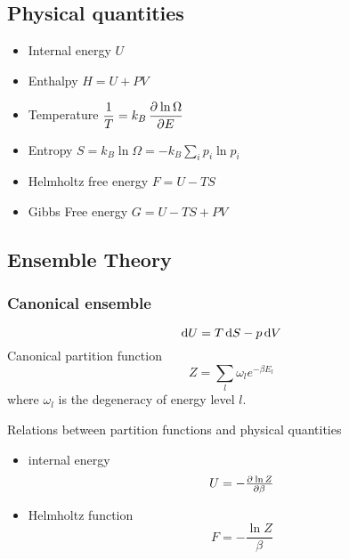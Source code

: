 \documentclass{article}
\begin{document}
\subsection{Physical quantities}
\begin{itemize}
\item Internal energy $U$
\item Enthalpy $H=U+PV$
\item Temperature $\dfrac{1}{T}=k_B\dpd{\ln\Omega}{E}$
\item Entropy $S=k_B\ln\Omega=-k_B\sum_i{p_i\ln p_i}$
\item Helmholtz free energy $F=U-TS$
\item Gibbs Free energy $G=U-TS+PV$
\end{itemize}
\subsection{Ensemble Theory}
\subsubsection{Canonical ensemble}
$$\dif U = T\dif S -p\dif V$$
Canonical partition function
\begin{equation}
\label{eq:CanonicalPartitionFunction}
Z=\sum_{l}\omega_l e^{-\beta E_{l}}
\end{equation}
where $\omega_l$ is the degeneracy of energy level $l$.\par
Relations between partition functions and physical quantities
\begin{itemize}
\item internal energy $$U=-\pd{\ln Z}{\beta}$$
\item Helmholtz function $$F=-\frac{\ln Z}{\beta}$$
\end{itemize}
\end{document}

